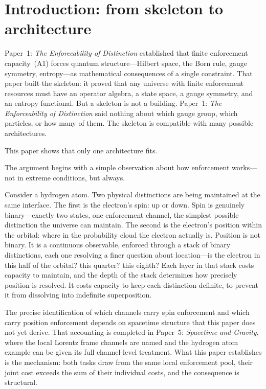 \documentclass[11pt]{article}
\begin{document}
\tableofcontents
\newpage


\section{Introduction: from skeleton to architecture}
\label{sec:intro}

Paper~1: \emph{The Enforceability of Distinction} established that finite enforcement capacity~(A1) forces quantum structure---Hilbert space, the Born rule, gauge symmetry, entropy---as mathematical consequences of a single constraint.  That paper built the skeleton: it proved that any universe with finite enforcement resources must have an operator algebra, a state space, a gauge symmetry, and an entropy functional.  But a skeleton is not a building.  Paper~1: \emph{The Enforceability of Distinction} said nothing about which gauge group, which particles, or how many of them.  The skeleton is compatible with many possible architectures.

This paper shows that only one architecture fits.

The argument begins with a simple observation about how enforcement works---not in extreme conditions, but always.

Consider a hydrogen atom.  Two physical distinctions are being maintained at the same interface.  The first is the electron's spin: up or down.  Spin is genuinely binary---exactly two states, one enforcement channel, the simplest possible distinction the universe can maintain.  The second is the electron's position within the orbital: where in the probability cloud the electron actually is.  Position is not binary.  It is a continuous observable, enforced through a stack of binary distinctions, each one resolving a finer question about location---is the electron in this half of the orbital? this quarter? this eighth?  Each layer in that stack costs capacity to maintain, and the depth of the stack determines how precisely position is resolved.  It costs capacity to keep each distinction definite, to prevent it from dissolving into indefinite superposition.

The precise identification of which channels carry spin enforcement and which carry position enforcement depends on spacetime structure that this paper does not yet derive.  That accounting is completed in Paper~5: \emph{Spacetime and Gravity}, where the local Lorentz frame channels are named and the hydrogen atom example can be given its full channel-level treatment.  What this paper establishes is the mechanism: both tasks draw from the same local enforcement pool, their joint cost exceeds the sum of their individual costs, and the consequence is structural.
\end{document}

